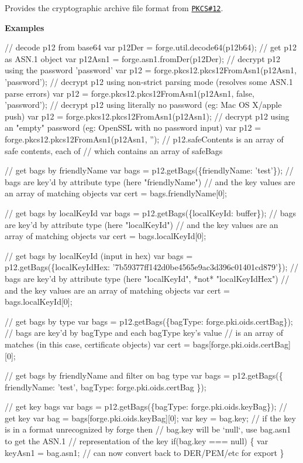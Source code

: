 Provides the cryptographic archive file format from \href{http://en.wikipedia.org/wiki/PKCS_%E2%99%AF12}{\tt P\+K\+CS\#12}.

{\bfseries Examples}


\begin{DoxyCode}
// decode p12 from base64
var p12Der = forge.util.decode64(p12b64);
// get p12 as ASN.1 object
var p12Asn1 = forge.asn1.fromDer(p12Der);
// decrypt p12 using the password 'password'
var p12 = forge.pkcs12.pkcs12FromAsn1(p12Asn1, 'password');
// decrypt p12 using non-strict parsing mode (resolves some ASN.1 parse errors)
var p12 = forge.pkcs12.pkcs12FromAsn1(p12Asn1, false, 'password');
// decrypt p12 using literally no password (eg: Mac OS X/apple push)
var p12 = forge.pkcs12.pkcs12FromAsn1(p12Asn1);
// decrypt p12 using an "empty" password (eg: OpenSSL with no password input)
var p12 = forge.pkcs12.pkcs12FromAsn1(p12Asn1, '');
// p12.safeContents is an array of safe contents, each of
// which contains an array of safeBags

// get bags by friendlyName
var bags = p12.getBags(\{friendlyName: 'test'\});
// bags are key'd by attribute type (here "friendlyName")
// and the key values are an array of matching objects
var cert = bags.friendlyName[0];

// get bags by localKeyId
var bags = p12.getBags(\{localKeyId: buffer\});
// bags are key'd by attribute type (here "localKeyId")
// and the key values are an array of matching objects
var cert = bags.localKeyId[0];

// get bags by localKeyId (input in hex)
var bags = p12.getBags(\{localKeyIdHex: '7b59377ff142d0be4565e9ac3d396c01401cd879'\});
// bags are key'd by attribute type (here "localKeyId", *not* "localKeyIdHex")
// and the key values are an array of matching objects
var cert = bags.localKeyId[0];

// get bags by type
var bags = p12.getBags(\{bagType: forge.pki.oids.certBag\});
// bags are key'd by bagType and each bagType key's value
// is an array of matches (in this case, certificate objects)
var cert = bags[forge.pki.oids.certBag][0];

// get bags by friendlyName and filter on bag type
var bags = p12.getBags(\{
  friendlyName: 'test',
  bagType: forge.pki.oids.certBag
\});

// get key bags
var bags = p12.getBags(\{bagType: forge.pki.oids.keyBag\});
// get key
var bag = bags[forge.pki.oids.keyBag][0];
var key = bag.key;
// if the key is in a format unrecognized by forge then
// bag.key will be `null`, use bag.asn1 to get the ASN.1
// representation of the key
if(bag.key === null) \{
  var keyAsn1 = bag.asn1;
  // can now convert back to DER/PEM/etc for export
\}


\end{DoxyCode}
